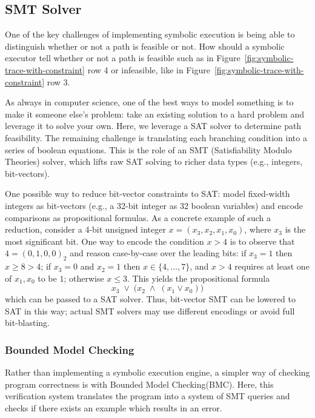 \documentclass[11pt]{article}
\begin{document}
\subsection{SMT Solver}

One of the key challenges of implementing symbolic execution is being able to distinguish whether or not a path is feasible or not. How should a symbolic executor tell whether or not a path is feasible such as in Figure~\ref{fig:symbolic-trace-with-constraint} row 4 or infeasible, like in Figure~\ref{fig:symbolic-trace-with-constraint} row 3.

As always in computer science, one of the best ways to model something is to make it someone else's problem: take an existing solution to a hard problem and leverage it to solve your own. Here, we leverage a SAT solver to determine path feasibility. The remaining challenge is translating each branching condition into a series of boolean equations. This is the role of an SMT (Satisfiability Modulo Theories) solver, which lifts raw SAT solving to richer data types (e.g., integers, bit-vectors). 

One possible way to reduce bit-vector constraints to SAT: model fixed-width integers as bit-vectors (e.g., a 32-bit integer as 32 boolean variables) and encode comparisons as propositional formulas. As a concrete example of such a reduction, consider a 4-bit unsigned integer $x = (x_3, x_2, x_1, x_0)$, where $x_3$ is the most significant bit. One way to encode the condition $x > 4$ is to observe that $4 = (0,1,0,0)_2$ and reason case-by-case over the leading bits: if $x_3 = 1$ then $x \geq 8 > 4$; if $x_3 = 0$ and $x_2 = 1$ then $x \in \{4,\ldots,7\}$, and $x > 4$ requires at least one of $x_1, x_0$ to be $1$; otherwise $x \leq 3$. This yields the propositional formula
\[
    x_3 \;\lor\; \bigl(x_2 \;\land\; (x_1 \lor x_0)\bigr)
\]
which can be passed to a SAT solver. Thus, bit-vector SMT can be lowered to SAT in this way; actual SMT solvers may use different encodings or avoid full bit-blasting.

\subsubsection{Bounded Model Checking}

Rather than implementing a symbolic execution engine, a simpler way of checking program correctness is with Bounded Model Checking(BMC). Here, this verification system translates the program into a system of SMT queries and checks if there exists an example which results in an error.
\end{document}
